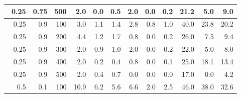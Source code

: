 \begin{longtable}{|r|r|r|r|r|r|r|r|r|r|r|r|}
        \hline \
        0.25                           & 0.75                     & 500                       & 2.0                       & 0.0                       & 0.5                       & 2.0                       & 0.0                       & 0.2                       & 21.2                      & 5.0                       & 9.0                       \\
        \hline \
        0.25                           & 0.9                     & 100                       & 3.0                       & 1.1                       & 1.4                       & 2.8                       & 0.8                       & 1.0                       & 40.0                      & 23.8                       & 20.2                       \\
        \hline \
        0.25                           & 0.9                     & 200                       & 4.4                       & 1.2                       & 1.7                       & 0.8                       & 0.0                       & 0.2                       & 26.0                      & 7.5                      & 9.4                      \\
        \hline \
        0.25                           & 0.9                     & 300                       & 2.0                       & 0.9                       & 1.0                       & 2.0                       & 0.0                       & 0.2                       & 22.0                      & 5.0                       & 8.0                       \\
        \hline \
        0.25                            & 0.9                     & 400                       & 2.0                      & 0.2                       & 0.4                       & 0.8                       & 0.0                       & 0.1                       & 25.0                      & 18.1                      & 13.4                      \\
        \hline \
        0.25                            & 0.9                     & 500                       & 2.0                       & 0.4                       & 0.7                       & 0.0                       & 0.0                       & 0.0                       & 17.0                      & 0.0                      & 4.2                      \\
        \hline \
        0.5                            & 0.1                     & 100                       & 10.9                       & 6.2                       & 5.6                       & 6.6                       & 2.0                       & 2.5                       & 46.0                      & 38.0                      & 32.6                      \\

\end{longtable}
